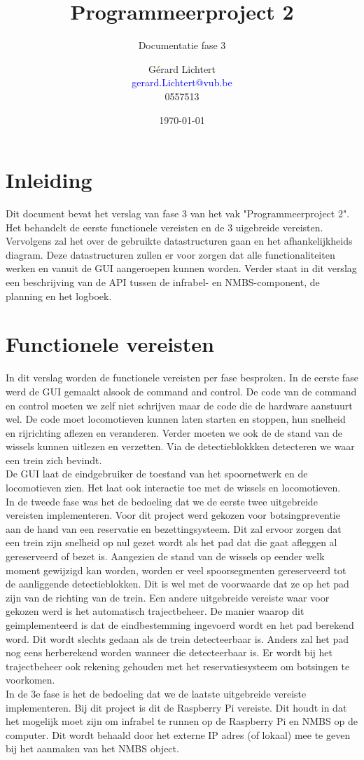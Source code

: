 \documentclass{article}
\title{Programmeerproject 2}
\subtitle{Documentatie fase 3}
\author{Gérard Lichtert\\
        \textcolor{blue}{gerard.Lichtert@vub.be}\\
        \textcolor{myblueish}{0557513}}
\date{\today}
\begin{document}
\maketitle
\tableofcontents
\pagebreak
\section{Inleiding}
Dit document bevat het verslag van fase 3 van het vak "Programmeerproject 2". Het behandelt 
de eerste functionele vereisten en de 3 uigebreide vereisten. 
Vervolgens zal het over de gebruikte datastructuren gaan en het afhankelijkheids diagram. 
Deze datastructuren zullen er voor zorgen dat alle functionaliteiten werken en vanuit 
de GUI aangeroepen kunnen worden. Verder staat in dit verslag een beschrijving van de API tussen
de infrabel- en NMBS-component, de planning en het logboek. 
\section{Functionele vereisten}
In dit verslag worden de functionele vereisten per fase besproken. In de eerste fase werd de 
GUI gemaakt alsook de command and control. De code van de command en control moeten we zelf
niet schrijven maar de code die de hardware aanstuurt wel. De code moet locomotieven kunnen laten
starten en stoppen, hun snelheid en rijrichting aflezen en veranderen. Verder moeten we ook de 
de stand van de wissels kunnen uitlezen en verzetten. Via de detectieblokkken detecteren we waar 
een trein zich bevindt. \\
De GUI laat de eindgebruiker de toestand van het spoornetwerk en de locomotieven zien. Het laat 
ook interactie toe met de wissels en locomotieven. \\
In de tweede fase was het de bedoeling dat we de eerste twee uitgebreide vereisten implementeren. Voor dit project werd 
gekozen voor botsingpreventie aan de hand van een reservatie en bezettingsysteem. Dit zal ervoor zorgen dat een trein zijn snelheid 
op nul gezet wordt als het pad dat die gaat afleggen al gereserveerd of bezet is. Aangezien de stand van de wissels op eender welk moment gewijzigd kan worden, worden
er veel spoorsegmenten gereserveerd tot de aanliggende detectieblokken. Dit is wel met de voorwaarde dat ze op het pad zijn van de richting van de trein. Een andere
uitgebreide vereiste waar voor gekozen werd is het automatisch trajectbeheer. De manier waarop dit geimplementeerd is dat de eindbestemming ingevoerd wordt en het pad berekend
word. Dit wordt slechts gedaan als de trein detecteerbaar is. Anders zal het pad nog eens herberekend worden wanneer die detecteerbaar is. Er wordt bij het trajectbeheer
ook rekening gehouden met het reservatiesysteem om botsingen te voorkomen. \\
In de 3e fase is het de bedoeling dat we de laatste uitgebreide vereiste implementeren. Bij dit project is dit de Raspberry Pi vereiste. Dit houdt in dat het mogelijk
moet zijn om infrabel te runnen op de Raspberry Pi en NMBS op de computer. Dit wordt behaald door het externe IP adres (of lokaal) mee te geven bij het aanmaken van het NMBS object.
\pagebreak
\end{document}
